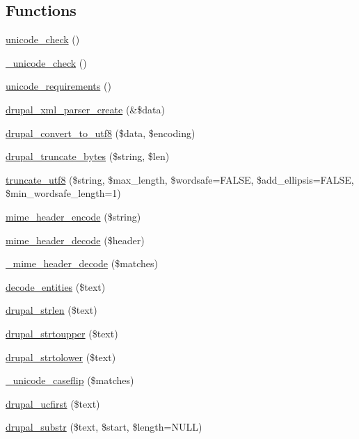 \subsection*{Functions}
\begin{DoxyCompactItemize}
\item 
\hyperlink{unicode_8inc_a20a41302a4e02b802bd51c57935cef3a}{unicode\_\-check} ()
\item 
\hyperlink{unicode_8inc_a8dd710941673e87ac38417d396622cba}{\_\-unicode\_\-check} ()
\item 
\hyperlink{unicode_8inc_a4323fb60679302048119c2a43f780d3c}{unicode\_\-requirements} ()
\item 
\hyperlink{group__php__wrappers_gab0e9cf694d0d48e586c117be348f1e24}{drupal\_\-xml\_\-parser\_\-create} (\&\$data)
\item 
\hyperlink{unicode_8inc_a1e6d4fad793d53424ed9c4244953337e}{drupal\_\-convert\_\-to\_\-utf8} (\$data, \$encoding)
\item 
\hyperlink{unicode_8inc_a5642d9adcf8fc48af1894523b9c52e96}{drupal\_\-truncate\_\-bytes} (\$string, \$len)
\item 
\hyperlink{unicode_8inc_aadfc295e976cb61cb8e4f1f1cf0c781e}{truncate\_\-utf8} (\$string, \$max\_\-length, \$wordsafe=FALSE, \$add\_\-ellipsis=FALSE, \$min\_\-wordsafe\_\-length=1)
\item 
\hyperlink{unicode_8inc_a079be0dce19618c9dfe392741e6af083}{mime\_\-header\_\-encode} (\$string)
\item 
\hyperlink{unicode_8inc_ab925f3117ef3c0d5736c4c38d0346aa3}{mime\_\-header\_\-decode} (\$header)
\item 
\hyperlink{unicode_8inc_a332130b9aa6b66fab3bc19e43a0eacae}{\_\-mime\_\-header\_\-decode} (\$matches)
\item 
\hyperlink{unicode_8inc_ac16f5ce77c68cec0acc3d0e193e5229c}{decode\_\-entities} (\$text)
\item 
\hyperlink{group__php__wrappers_gae8a4670a2f9b1c67d02259a49ee3ec7e}{drupal\_\-strlen} (\$text)
\item 
\hyperlink{group__php__wrappers_ga14c13d4684fa3dbed977bdcbf8f3a5d5}{drupal\_\-strtoupper} (\$text)
\item 
\hyperlink{group__php__wrappers_gad97b9d0b7d26db7c62671e9ddce98f8f}{drupal\_\-strtolower} (\$text)
\item 
\hyperlink{unicode_8inc_a3c12a2422e0b0719d038fe9b5092413c}{\_\-unicode\_\-caseflip} (\$matches)
\item 
\hyperlink{group__php__wrappers_ga15c15887a3e78bd69a50439373823517}{drupal\_\-ucfirst} (\$text)
\item 
\hyperlink{group__php__wrappers_gabe05f7e9107211f3ad82b564b1d7d598}{drupal\_\-substr} (\$text, \$start, \$length=NULL)
\end{DoxyCompactItemize}


